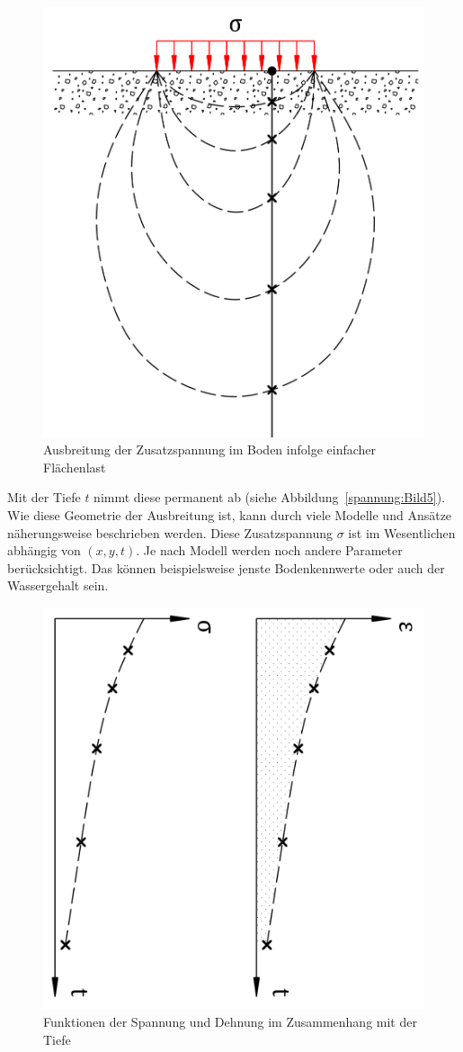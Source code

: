 \begin{figure}
	\centering
	\includegraphics[width=0.4\linewidth,keepaspectratio]{papers/spannung/Grafiken/Bild4.png}
	\caption{Ausbreitung der Zusatzspannung im Boden infolge einfacher Flächenlast}
	\label{fig:Bild4}
\end{figure}

Mit der Tiefe $t$ nimmt diese permanent ab (siehe Abbildung~\ref{spannung:Bild5}).
Wie diese Geometrie der Ausbreitung ist, kann durch viele Modelle und Ansätze näherungsweise beschrieben werden.
Diese Zusatzspannung $\sigma$ ist im Wesentlichen abhängig von $(x,y,t)$.
Je nach Modell werden noch andere Parameter berücksichtigt.
Das können beispielsweise jenste Bodenkennwerte oder auch der Wassergehalt sein.

\begin{figure}
	\centering
	\includegraphics[width=0.35\linewidth,keepaspectratio]{papers/spannung/Grafiken/Bild5.png}
	\caption{Funktionen der Spannung und Dehnung im Zusammenhang mit der Tiefe}
	\label{fig:Bild5}
\end{figure}

